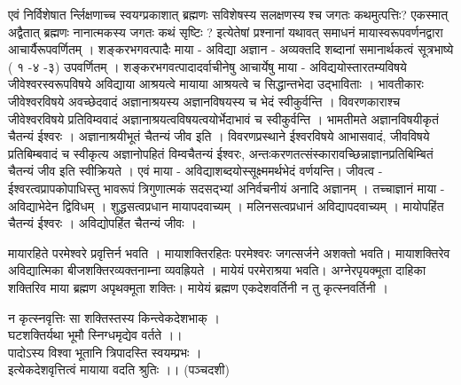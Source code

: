  
एवं निर्विशेषात र्न्लिक्षणाच्च स्वयग्प्रकाशात् ब्रह्मणः सविशेषस्य सलक्षणस्य श्च जगतः कथमुत्पत्तिः? एकस्मात् अद्वैतात् ब्रह्मणः नानात्मकस्य जगतः कथं सृष्टिः ? इत्येतेषां प्रश्नानां यथावत्
समाधनं मायास्वरूपवर्णनद्वारा आचार्यैरूपवर्णितम् । शङ्करभगवत्पादैः माया - अविद्या अज्ञान - अव्यक्तदि शब्दानां समानार्थकत्वं सूत्रभाष्ये ( १ -४ -३) उपवर्णितम् । शङ्करभगवत्पादादर्वाचीनेषु आचार्येषु माया - अविद्ययोस्तारतम्यविषये जीवेश्वरस्वरूपविषये अविद्याया आश्रयत्वे मायाया आश्रयत्वे च सिद्धान्तभेदा उद्भाविताः । भावतीकारः जीवेश्वरविषये अवच्छेदवादं अज्ञानाश्रयस्य अज्ञानविषयस्य च भेदं स्वीकुर्वन्ति । विवरणकाराश्च जीवेश्वरविषये प्रतिविम्ववादं अज्ञानाश्रयत्वविषयत्वयोर्भेदाभावं च स्वीकुर्वन्ति । भामतीमते अज्ञानविषयीकृतं चैतन्यं ईश्वरः । अज्ञानाश्रयीभूतं चैतन्यं जीव इति । विवरणप्रस्थाने ईश्वरविषये आभासवादं, जीवविषये प्रतिबिम्बवादं च स्वीकृत्य अज्ञानोपहितं विम्वचैतन्यं ईश्वरः, अन्तःकरणतत्संस्कारावच्छिन्नाज्ञानप्रतिबिम्बितं चैतन्यं जीव इति स्वीक्रियते । एवं माया - अविद्याशब्दयोस्सूक्ष्ममर्थभेदं वर्णयन्ति। जीवत्व - ईश्वरत्वप्रापकोपाधिस्तु भावरूपं त्रिगुणात्मकं सदसद्भ्यां अनिर्वचनीयं अनादि अज्ञानम् । तच्चाज्ञानं माया - अविद्याभेदेन द्विविधम् । शुद्धसत्वप्रधान मायापदवाच्यम् । मलिनसत्वप्रधानं अविद्यापदवाच्यम् । मायोपहिंत चैतन्यं ईश्वरः । अविद्योपहिंत चैतन्यं जीवः ।

मायारहिते परमेश्वरे प्रवृत्तिर्न भवति । मायाशक्तिरहितः परमेश्वरः जगत्सर्जने अशक्तो भवति। मायाशक्तिरेव अविद्यात्मिका बीजशक्तिरव्यक्तनाम्ना व्यवह्रियते । मायेयं परमेराश्रया भवति। 
अग्नेरपृयक्मूता दाहिका शक्तिरिव माया ब्रह्मण अपृथक्मूता शक्तिः। मायेयं ब्रह्मण एकदेशवर्तिनी न तु कृत्स्नवर्तिनी । 

न कृत्स्नवृत्तिः सा शक्तिस्तस्य किन्त्वेकदेशभाक् । \\
घटशक्तिर्यथा भूमौ स्निग्धमृद्येव वर्तते ।। \\
पादोऽस्य विश्वा भूतानि त्रिपादस्ति स्वयम्प्रभः ।\\
इत्येकदेशवृत्तित्वं मायाया वदति श्रुतिः ।। (पञ्चदशी)\\
 

